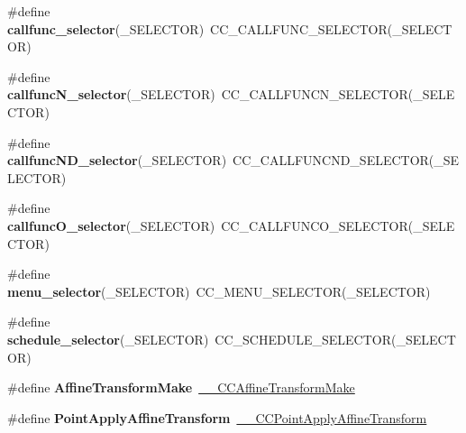 \begin{DoxyCompactItemize}
\item 
\mbox{\label{group__base_gadbfffb29c6db99730b3725d392b5c6ce}} 
\#define {\bfseries callfunc\+\_\+selector}(\+\_\+\+S\+E\+L\+E\+C\+T\+OR)~C\+C\+\_\+\+C\+A\+L\+L\+F\+U\+N\+C\+\_\+\+S\+E\+L\+E\+C\+T\+OR(\+\_\+\+S\+E\+L\+E\+C\+T\+OR)
\item 
\mbox{\label{group__base_gaae5d36086e660775212ac58171e5b9c1}} 
\#define {\bfseries callfunc\+N\+\_\+selector}(\+\_\+\+S\+E\+L\+E\+C\+T\+OR)~C\+C\+\_\+\+C\+A\+L\+L\+F\+U\+N\+C\+N\+\_\+\+S\+E\+L\+E\+C\+T\+OR(\+\_\+\+S\+E\+L\+E\+C\+T\+OR)
\item 
\mbox{\label{group__base_gaf6e1b4d4334a7aa7950a17f361aaff80}} 
\#define {\bfseries callfunc\+N\+D\+\_\+selector}(\+\_\+\+S\+E\+L\+E\+C\+T\+OR)~C\+C\+\_\+\+C\+A\+L\+L\+F\+U\+N\+C\+N\+D\+\_\+\+S\+E\+L\+E\+C\+T\+OR(\+\_\+\+S\+E\+L\+E\+C\+T\+OR)
\item 
\mbox{\label{group__base_ga7b930d3a73de79074daa4523fa18df73}} 
\#define {\bfseries callfunc\+O\+\_\+selector}(\+\_\+\+S\+E\+L\+E\+C\+T\+OR)~C\+C\+\_\+\+C\+A\+L\+L\+F\+U\+N\+C\+O\+\_\+\+S\+E\+L\+E\+C\+T\+OR(\+\_\+\+S\+E\+L\+E\+C\+T\+OR)
\item 
\mbox{\label{group__base_gaaf4135f283ffa04049acdd0d98ced399}} 
\#define {\bfseries menu\+\_\+selector}(\+\_\+\+S\+E\+L\+E\+C\+T\+OR)~C\+C\+\_\+\+M\+E\+N\+U\+\_\+\+S\+E\+L\+E\+C\+T\+OR(\+\_\+\+S\+E\+L\+E\+C\+T\+OR)
\item 
\mbox{\label{group__base_ga32d629acb8d8cbd2fdb9bf98f45736b7}} 
\#define {\bfseries schedule\+\_\+selector}(\+\_\+\+S\+E\+L\+E\+C\+T\+OR)~C\+C\+\_\+\+S\+C\+H\+E\+D\+U\+L\+E\+\_\+\+S\+E\+L\+E\+C\+T\+OR(\+\_\+\+S\+E\+L\+E\+C\+T\+OR)
\item 
\mbox{\label{group__base_ga6f5f5e63a840aa04d1d728fd57e4bfcc}} 
\#define {\bfseries Affine\+Transform\+Make}~\hyperlink{group__base_ga6512cedee05a78771b7aac4e4d57a499}{\+\_\+\+\_\+\+C\+C\+Affine\+Transform\+Make}
\item 
\mbox{\label{group__base_gacaf876df474d9bf68df41235654bec40}} 
\#define {\bfseries Point\+Apply\+Affine\+Transform}~\hyperlink{group__base_ga925cec1fb977da8fb3d8280ba82cc5c7}{\+\_\+\+\_\+\+C\+C\+Point\+Apply\+Affine\+Transform}

\end{DoxyCompactItemize}
